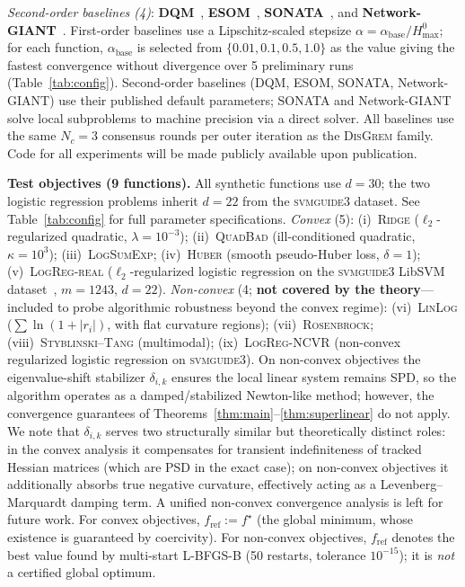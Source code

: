 \documentclass[11pt,a4paper]{article}
\begin{document}
	\noindent\textit{Second-order baselines (4)}:
	\textbf{DQM}~\citep{eisen2017dqn},
	\textbf{ESOM}~\citep{mokhtari2016esom},
	\textbf{SONATA}~\citep{sun2022sonata}, and
	\textbf{Network-GIANT}~\citep{ye2023networkgiant}.
	First-order baselines use a Lipschitz-scaled stepsize
	$\alpha=\alpha_{\mathrm{base}}/H_{\max}^{0}$;
	for each function, $\alpha_{\mathrm{base}}$ is selected from
	$\{0.01, 0.1, 0.5, 1.0\}$ as the value giving the fastest
	convergence without divergence over 5 preliminary runs
	(Table~\ref{tab:config}).
	Second-order baselines (DQM, ESOM, SONATA, Network-GIANT) use their
	published default parameters; SONATA and Network-GIANT solve local
	subproblems to machine precision via a direct solver.
	All baselines use the same $N_c{=}3$ consensus rounds per outer
	iteration as the \textsc{DisGrem} family.
	Code for all experiments will be made publicly available upon
	publication.
	
	\noindent\textbf{Test objectives (9 functions).}
	All synthetic functions use $d{=}30$; the two logistic regression problems
	inherit $d{=}22$ from the \textsc{svmguide3} dataset.
	See Table~\ref{tab:config} for full parameter specifications.
	\textit{Convex} (5):
	(i)~\textsc{Ridge} ($\ell_2$-regularized quadratic, $\lambda{=}10^{-3}$);
	(ii)~\textsc{QuadBad} (ill-conditioned quadratic, $\kappa{=}10^3$);
	(iii)~\textsc{LogSumExp};
	(iv)~\textsc{Huber} (smooth pseudo-Huber loss, $\delta{=}1$);
	(v)~\textsc{LogReg-real} ($\ell_2$-regularized logistic regression on the
	\textsc{svmguide3} LibSVM dataset~\citep{chang2011libsvm}, $m{=}1243$, $d{=}22$).
	\textit{Non-convex} (4; \textbf{not covered by the theory}---included
	to probe algorithmic robustness beyond the convex regime):
	(vi)~\textsc{LinLog} ($\sum\ln(1{+}|r_i|)$, with flat curvature regions);
	(vii)~\textsc{Rosenbrock};
	(viii)~\textsc{Styblinski--Tang} (multimodal);
	(ix)~\textsc{LogReg-NCVR} (non-convex regularized logistic regression on
	\textsc{svmguide3}).
	On non-convex objectives the eigenvalue-shift stabilizer $\delta_{i,k}$
	ensures the local linear system remains SPD, so the algorithm operates
	as a damped/stabilized Newton-like method; however, the convergence
	guarantees of Theorems~\ref{thm:main}--\ref{thm:superlinear} do not apply.
	We note that $\delta_{i,k}$ serves two structurally similar but
	theoretically distinct roles:
	in the convex analysis it compensates for transient indefiniteness of
	tracked Hessian matrices (which are PSD in the exact case);
	on non-convex objectives it additionally absorbs true negative curvature,
	effectively acting as a Levenberg--Marquardt damping term.
	A unified non-convex convergence analysis is left for future work.
	For convex objectives, $f_{\mathrm{ref}}:=f^\star$ (the global minimum,
	whose existence is guaranteed by coercivity).
	For non-convex objectives, $f_{\mathrm{ref}}$ denotes the best value
	found by multi-start L-BFGS-B (50 restarts, tolerance $10^{-15}$);
	it is \emph{not} a certified global optimum.
	
\end{document}
